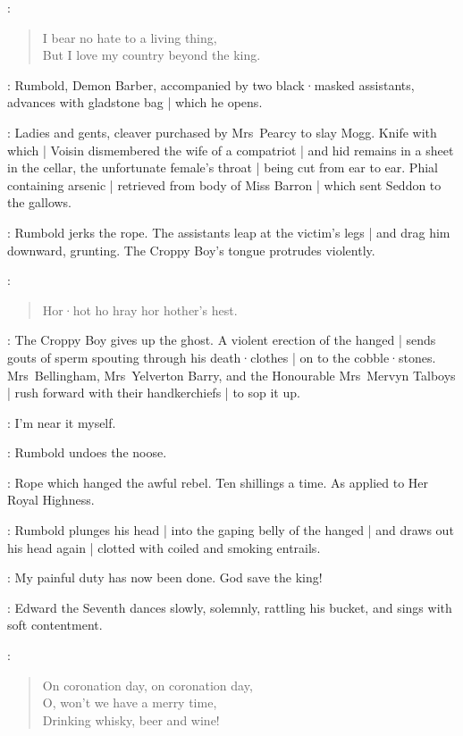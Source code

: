 \CroppyBoy:
\begin{verse}
    I bear no hate to a living thing,\\
    But I love my country beyond the king.
\end{verse}

:
Rumbold,
Demon Barber,
accompanied by two black·masked assistants,
advances with gladstone bag |
which he opens.

\RumboldDemonBarber:
Ladies and gents,
cleaver purchased by Mrs~Pearcy to slay Mogg.
Knife with which |
Voisin dismembered the wife of a compatriot |
and hid remains in a sheet in the cellar,
%
the unfortunate female's throat |
being cut from ear to ear.
Phial containing arsenic |
retrieved from body of Miss Barron |
which sent Seddon to the gallows.

:
Rumbold jerks the rope.
The assistants leap at the victim's legs |
and drag him downward,
grunting.
The Croppy Boy's tongue protrudes violently.

\CroppyBoy:
\begin{verse}
    Hor·hot ho hray hor hother's hest.
\end{verse}

:
The Croppy Boy gives up the ghost.
A violent erection of the hanged |
sends gouts of sperm spouting through his death·clothes |
on to the cobble·stones.
Mrs~Bellingham,
Mrs~Yelverton Barry,
%
and the Honourable Mrs~Mervyn Talboys |
rush forward with their handkerchiefs |
to sop it up.

\Rumbold:
I'm near it myself.

:
Rumbold undoes the noose.

\Rumbold:
Rope which hanged the awful rebel.
Ten shillings a time.
As applied to Her Royal Highness.

:
Rumbold plunges his head |
into the gaping belly of the hanged |
and draws out his head again |
clotted with coiled and smoking entrails.

\Rumbold:
My painful duty has now been done.
God save the king!

:
Edward the Seventh dances slowly,
solemnly,
rattling his bucket,
and
%
sings with soft contentment.

\EdwardSeventh:
\begin{verse}
    On coronation day, on coronation day,\\
    O, won't we have a merry time,\\
    Drinking whisky, beer and wine!
\end{verse}

